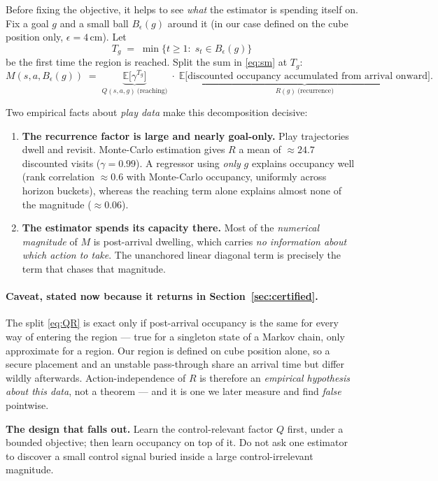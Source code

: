 \documentclass[11pt]{article}
\newcommand{\E}{\mathbb{E}}
\newcommand{\ball}[1]{B_\epsilon(#1)}
\begin{document}
Before fixing the objective, it helps to see \emph{what} the estimator is spending
itself on. Fix a goal $g$ and a small ball $\ball{g}$ around it (in our case
defined on the cube position only, $\epsilon = 4$\,cm). Let
\[
T_g \;=\; \min\{t\ge1:\; s_t\in \ball{g}\}
\]
be the first time the region is reached. Split the sum in \eqref{eq:sm} at $T_g$:
\begin{equation}
\label{eq:QR}
M(s,a,\ball{g})
\;=\;
\underbrace{\E\big[\gamma^{T_g}\big]}_{\textstyle Q(s,a,g)\ \text{(reaching)}}
\;\cdot\;
\underbrace{\E\big[\text{discounted occupancy accumulated from arrival onward}\big]}_{\textstyle R(g)\ \text{(recurrence)}}.
\end{equation}

Two empirical facts about \emph{play data} make this decomposition decisive:
\begin{enumerate}[leftmargin=1.5em]
\item \textbf{The recurrence factor is large and nearly goal-only.} Play
trajectories dwell and revisit. Monte-Carlo estimation gives $R$ a mean of
$\approx 24.7$ discounted visits ($\gamma=0.99$). A regressor using \emph{only}
$g$ explains occupancy well (rank correlation $\approx 0.6$ with Monte-Carlo
occupancy, uniformly across horizon buckets), whereas the reaching term alone
explains almost none of the magnitude ($\approx 0.06$).
\item \textbf{The estimator spends its capacity there.} Most of the \emph{numerical
magnitude} of $M$ is post-arrival dwelling, which carries \emph{no information
about which action to take}. The unanchored linear diagonal term is precisely the
term that chases that magnitude.
\end{enumerate}

\paragraph{Caveat, stated now because it returns in Section~\ref{sec:certified}.}
The split \eqref{eq:QR} is exact only if post-arrival occupancy is the same for
every way of entering the region --- true for a singleton state of a Markov chain,
only approximate for a region. Our region is defined on cube position alone, so a
secure placement and an unstable pass-through share an arrival time but differ
wildly afterwards. Action-independence of $R$ is therefore an \emph{empirical
hypothesis about this data}, not a theorem --- and it is one we later measure and
find \emph{false} pointwise.

\begin{keybox}
\textbf{The design that falls out.} Learn the control-relevant factor
$Q$ first, under a bounded objective; then learn occupancy on top of it. Do not
ask one estimator to discover a small control signal buried inside a large
control-irrelevant magnitude.
\end{keybox}
\end{document}
